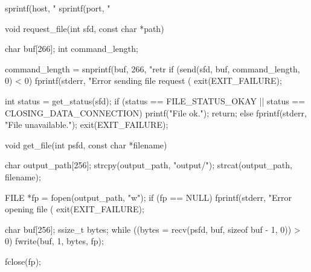 \documentclass[11pt,a4paper,twocolumn]{article}
\begin{document}
\begin{c-darktheme}
{    sprintf(host, "%
    sprintf(port, "%
}

void request_file(int sfd, const char *path)
{
    char buf[266];
    int command_length;

    command_length = snprintf(buf, 266, "retr %
    if (send(sfd, buf, command_length, 0) < 0)
    {
        fprintf(stderr, "Error sending file request (%
        exit(EXIT_FAILURE);
    }

    int status = get_status(sfd);
    if (status == FILE_STATUS_OKAY || status == CLOSING_DATA_CONNECTION)
    {
        printf("File ok.\n");
        return;
    }
    else
    {
        fprintf(stderr, "File unavailable.\n");
        exit(EXIT_FAILURE);
    }
}

void get_file(int psfd, const char *filename)
{
    char output_path[256];
    strcpy(output_path, "output/");
    strcat(output_path, filename);

    FILE *fp = fopen(output_path, "w");
    if (fp == NULL)
    {
        fprintf(stderr, "Error opening file (%
        exit(EXIT_FAILURE);
    }

    char buf[256];
    ssize_t bytes;
    while ((bytes = recv(psfd, buf, sizeof buf - 1, 0)) > 0)
    {
        fwrite(buf, 1, bytes, fp);
    }

    fclose(fp);
}

\end{c-darktheme}
\end{document}
